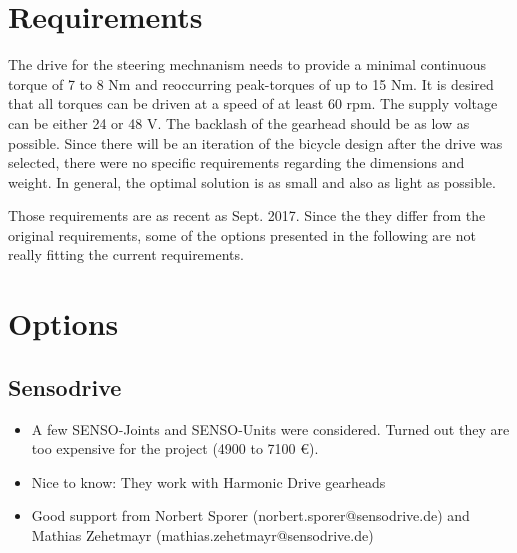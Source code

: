 \documentclass[a4paper]{article}
\title{\bf \maintitle\\
  \vspace{1cm}
  {\large
    \subtitle%
  }
}
\author{Nikolas Schroeder\\
  Institute for Systems Theory and Automatic Control\\
  \texttt{lrt86824@stud.uni-stuttgart.de}%
}
\date{\today}
\begin{document}
\maketitle

\hrulefill
\begin{abstract}
This report gives a short overview of the different drives and motor controllers that were considered for the bicycle's steering mechanism. 
\end{abstract}

\hrulefill

\pagebreak

\section{Requirements}

The drive for the steering mechnanism needs to provide a minimal continuous torque of 7 to 8 Nm and reoccurring peak-torques of up to 15 Nm. It is desired that all torques can be driven at a speed of at least 60 rpm. The supply voltage can be either 24 or 48 V. The backlash of the gearhead should be as low as possible. Since there will be an iteration of the bicycle design after the drive was selected, there were no specific requirements regarding the dimensions and weight. In general, the optimal solution is as small and also as light as possible. 

\bigskip

Those requirements are as recent as Sept. 2017. Since the they differ from the original requirements, some of the options presented in the following are not really fitting the current requirements. 

\bigskip



{\small


}


\section{Options}


\subsection{Sensodrive}

\begin{itemize}

\item A few SENSO-Joints and SENSO-Units were considered. Turned out they are too expensive for the project (4900 to 7100 \euro). 

\item Nice to know: They work with Harmonic Drive gearheads

\item Good support from Norbert Sporer (norbert.sporer@sensodrive.de) and Mathias Zehetmayr (mathias.zehetmayr@sensodrive.de)

\end{itemize}
 
\end{document}
